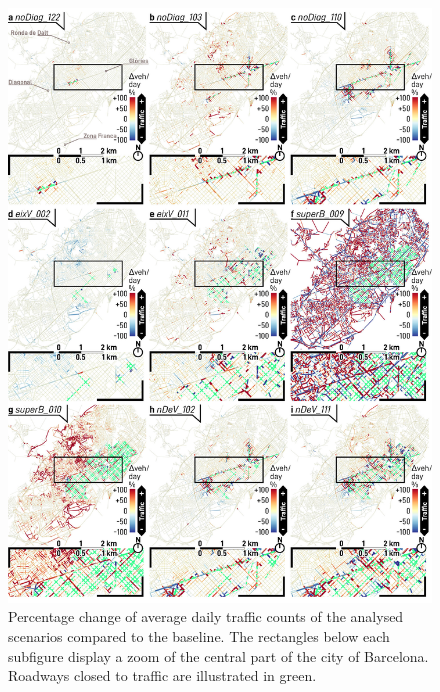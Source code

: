 \begin{figure}[htbp!]
    \centering
    \includegraphics[width=1\textwidth]{LCBM_fig_map_02.jpg}
    \captionsetup{font=scriptsize}
    \caption{Percentage change of average daily traffic counts of the analysed scenarios compared to the baseline. The rectangles below each subfigure display a zoom of the central part of the city of Barcelona. Roadways closed to traffic are illustrated in green.}
   \label{fig:LCBM_fig_map_02}
\end{figure}

